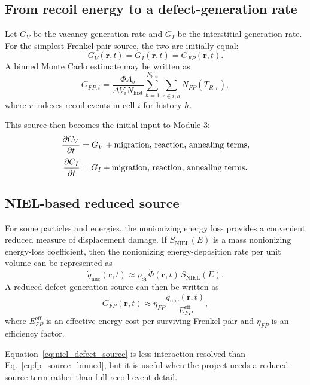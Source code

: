 \documentclass[11pt]{article}
\newcommand{\qnuc}{\dot{q}_{\mathrm{nuc}}}
\newcommand{\Phidot}{\dot{\Phi}}
\newcommand{\NIEL}{\mathrm{NIEL}}
\newcommand{\rpos}{\mathbf{r}}
\newcommand{\rhoSi}{\rho_{\mathrm{Si}}}
\begin{document}
\subsection{From recoil energy to a defect-generation rate}

Let $G_V$ be the vacancy generation rate and $G_I$ be the interstitial generation rate. For the simplest Frenkel-pair source, the two are initially equal:
\begin{equation}
G_V(\rpos,t) = G_I(\rpos,t) = G_{FP}(\rpos,t).
\end{equation}
A binned Monte Carlo estimate may be written as
\begin{equation}
G_{FP,i}
=
\frac{\Phidot A_b}{\Delta V_i N_{\mathrm{hist}}}
\sum_{h=1}^{N_{\mathrm{hist}}}
\sum_{r\in i,h} N_{FP}(T_{R,r}),
\label{eq:fp_source_binned}
\end{equation}
where $r$ indexes recoil events in cell $i$ for history $h$.

This source then becomes the initial input to Module 3:
\begin{equation}
\pdv{C_V}{t}=G_V + \text{migration, reaction, annealing terms},
\end{equation}
\begin{equation}
\pdv{C_I}{t}=G_I + \text{migration, reaction, annealing terms}.
\end{equation}

\subsection{NIEL-based reduced source}

For some particles and energies, the nonionizing energy loss provides a convenient reduced measure of displacement damage. If $S_{\NIEL}(E)$ is a mass nonionizing energy-loss coefficient, then the nonionizing energy-deposition rate per unit volume can be represented as
\begin{equation}
\qnuc(\rpos,t)
\approx
\rhoSi\,\Phidot(\rpos,t)\,S_{\NIEL}(E).
\label{eq:niel_qnuc}
\end{equation}
A reduced defect-generation source can then be written as
\begin{equation}
G_{FP}(\rpos,t)
\approx
\eta_{FP}\frac{\qnuc(\rpos,t)}{E_{FP}^{\mathrm{eff}}},
\label{eq:niel_defect_source}
\end{equation}
where $E_{FP}^{\mathrm{eff}}$ is an effective energy cost per surviving Frenkel pair and $\eta_{FP}$ is an efficiency factor.

Equation~\eqref{eq:niel_defect_source} is less interaction-resolved than Eq.~\eqref{eq:fp_source_binned}, but it is useful when the project needs a reduced source term rather than full recoil-event detail.
\end{document}
